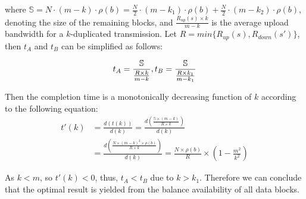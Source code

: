 
where $\mathbb{S}=N\cdot (m-k)\cdot \rho(b)=\frac{N}{2}\cdot (m-k_1)\cdot \rho(b) + \frac{N}{2}\cdot (m-k_2)\cdot \rho(b)$, denoting the size of the remaining blocks, and $\frac{R_{up}(s)\times k}{m-k}$ is the average upload bandwidth for a $k$-duplicated transmission. Let $R=min\{R_{up}(s),R_{down}(s')\}$, then $t_A$ and $t_B$ can be simplified as follows:

\begin{equation}
\label{equa:simp}
t_A = \frac{\mathbb{S}}{\frac{R\times k}{m-k}}, t_B = \frac{\mathbb{S}}{\frac{R\times k_1}{m-k_1}}\\
\end{equation}

Then the completion time is a monotonically decreasing function of $k$ according to the following equation:
\begin{equation}
\label{calculus}
\begin{split}
t'(k) &= \frac{d(t(k))}{d(k)} = \frac{d(\frac{\mathbb{S}\times (m-k)}{R\times k})}{d(k)} \\
    &= \frac{d(\frac{N\times (m-k)^2\times \rho(b)}{R\times k})}{d(k)} = \frac{N\times \rho(b)}{R} \times (1-\frac{m^2}{k^2})
\end{split}
\end{equation}

%
%
%
As $k<m$, so $t'(k)<0$, thus, $t_A<t_B$ due to $k>k_1$. Therefore we can conclude that the optimal result is yielded from the balance availability of all data blocks.

